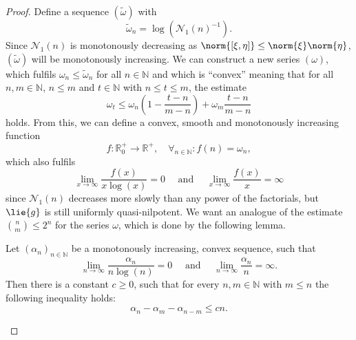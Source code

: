 \documentclass[
11pt,                          %
english                        %
]{article}
\begin{document}
\begin{proof}
	Define a sequence $(\widetilde{\omega})$ with
	\begin{equation*}
		\widetilde{\omega}_n
		=
		\log \left(
			\mathcal{N}_1(n)^{-1}
		\right).
	\end{equation*}
	Since $\mathcal{N}_1(n)$ is monotonously decreasing as $\norm{[\xi, \eta]} \leq 
	\norm{\xi} \norm{\eta}$, $(\widetilde{\omega})$ will be monotonously increasing.
	We can construct a new series $(\omega)$, which fulfils 
	$\omega_n \leq \widetilde{\omega}_n$ for all $n \in \mathbb{N}$ and which is 
	``convex'' meaning that for all $n, m \in \mathbb{N}$, 
	$n \leq m$ and $t \in \mathbb{N}$ with $n \leq t \leq m$, the estimate
	\begin{equation*}
		\omega_t 
		\leq 
		\omega_n \left( 1 - \frac{t - n}{m - n} \right) + 
		\omega_m \frac{t - n}{m - n}
	\end{equation*}
	holds. From this, we can define a convex, smooth and monotonously increasing 
	function
	\begin{equation*}
		f \colon
		\mathbb{R}_0^+
		\longrightarrow
		\mathbb{R}^+
		, \quad
		\forall_{n \in \mathbb{N}}
		\colon
		f(n) 
		=
		\omega_n,
	\end{equation*}
	which also fulfils
	\begin{equation*}
		\lim_{x \rightarrow \infty}
		\frac{f(x)}{x \log(x)}
		=
		0
		\quad \text{ and } \quad
		\lim_{x \rightarrow \infty}
		\frac{f(x)}{x}
		=
		\infty
	\end{equation*}
	since $\mathcal{N}_1(n)$ decreases more slowly than any power of the factorials, 
	but $\lie{g}$ is still uniformly quasi-nilpotent. We want an analogue of the 
	estimate $\binom{n}{m} \leq 2^n$ for the series $\omega$, which is done by the 
	following lemma.
	\begin{lemma}
		Let $(\alpha_n)_{n \in \mathbb{N}}$ be a monotonously increasing, convex 
		sequence, such that
		\begin{equation*}
			\lim_{n \rightarrow \infty}
			\frac{\alpha_n}{n \log(n)}
			=
			0
			\quad \text{ and } \quad
			\lim_{n \rightarrow \infty}
			\frac{\alpha_n}{n}
			=
			\infty.
		\end{equation*}
		Then there is a constant $c \geq 0$, such that for every $n,m \in 
		\mathbb{N}$ with $m \leq n$ the following inequality holds:
		\begin{equation}
		\label{Lemma:LogBinomialEstimate}
			\alpha_n - \alpha_m - \alpha_{n-m}
			\leq
			c n.
		\end{equation}

\end{lemma}
\end{proof}
\end{document}

